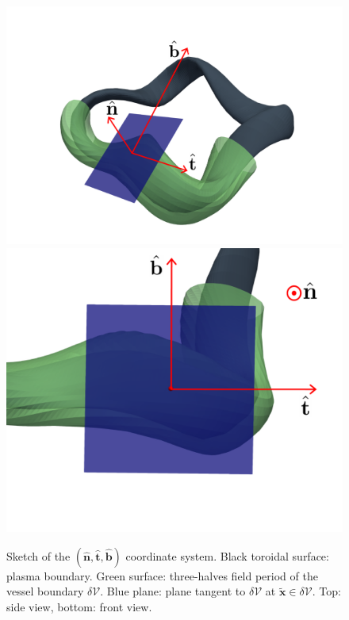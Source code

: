 \documentclass[12pt]{article}
\begin{document}
\begin{figure}
    \centering
    \includegraphics[width=.75\textwidth]{figures/tangent_plane_coordinate.pdf}\\
    \includegraphics[width=.75\textwidth]{figures/tangent_plane_coordinate_front.pdf}
    \caption{Sketch of the $(\hat{\mathbf{n}},\hat{\mathbf{t}},\hat{\textbf{b}})$ coordinate system. Black toroidal surface: plasma boundary. Green surface: three-halves field period of the vessel boundary $\delta\mathcal{V}$. Blue plane: plane tangent to $\delta\mathcal{V}$ at $\tilde{\mathbf{x}}\in\delta\mathcal{V}$. Top: side view, bottom: front view.}
    \label{fig.tangent_coordinates}
\end{figure}
\end{document}
